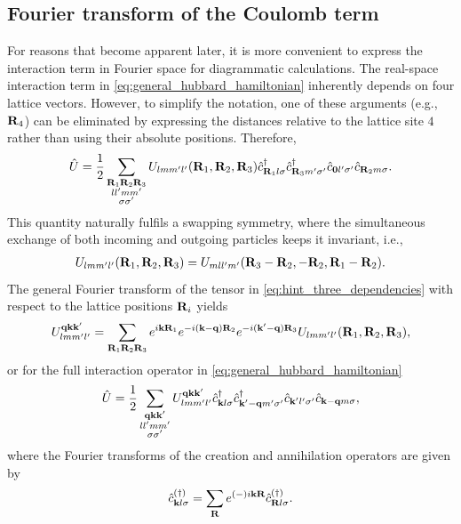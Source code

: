 \documentclass[../../main.tex]{subfiles}
\begin{document}
\subsection{Fourier transform of the Coulomb term}

For reasons that become apparent later, it is more convenient to express the interaction term in Fourier space for diagrammatic calculations. The real-space interaction term in \eqref{eq:general_hubbard_hamiltonian} inherently depends on four lattice vectors. However, to simplify the notation, one of these arguments (e.g., $\textbf{R}_4$) can be eliminated by expressing the distances relative to the lattice site $4$ rather than using their absolute positions. Therefore, 
\begin{align}
	\hat U=\frac 12 \sum_{\substack{\textbf{R}_1\textbf{R}_2\textbf{R}_3\\ ll'mm'\\\sigma\sigma'}}U_{lmm'l'}(\textbf{R}_1,\textbf{R}_2,\textbf{R}_3) \hat c^{\dagger}_{\textbf{R}_1l\sigma} \hat c^{\dagger}_{\textbf{R}_3 m'\sigma'} \hat c_{\textbf{0}l'\sigma'} \hat c_{\textbf{R}_2m\sigma}.\label{eq:hint_three_dependencies}
\end{align} 
This quantity naturally fulfils a swapping symmetry, where the simultaneous exchange of both incoming and outgoing particles keeps it invariant, i.e.,
\begin{align}
 	U_{lmm'l'}(\textbf{R}_1,\textbf{R}_2,\textbf{R}_3)=U_{mll'm'}(\textbf{R}_3-\textbf{R}_2,-\textbf{R}_2,\textbf{R}_1-\textbf{R}_2).
\end{align} 
The general Fourier transform of the tensor in \eqref{eq:hint_three_dependencies} with respect to the lattice positions $\textbf{R}_i$ yields
\begin{align}
	U_{lmm'l'}^{\textbf{qkk}'}=\sum_{\textbf{R}_1\textbf{R}_2\textbf{R}_3} e^{i\textbf{kR}_1}e^{-i(\textbf{k}-\textbf{q})\textbf{R}_2}e^{-i(\textbf{k}'-\textbf{q})\textbf{R}_3}U_{lmm'l'}(\textbf{R}_1,\textbf{R}_2,\textbf{R}_3),
\end{align}
or for the full interaction operator in \eqref{eq:general_hubbard_hamiltonian}
\begin{align}
	\hat U=\frac 12 \sum_{\substack{\textbf{qkk}'\\ ll'mm'\\\sigma\sigma'}}U_{lmm'l'}^{\textbf{qkk}'}\hat c^{\dagger}_{\textbf{k}l\sigma} \hat c^{\dagger}_{\textbf{k}'-\textbf{q} m'\sigma'} \hat c_{\textbf{k}'l'\sigma'} \hat c_{\textbf{k}-\textbf{q}m\sigma},
\end{align}
where the Fourier transforms of the creation and annihilation operators are given by
\begin{align}
	\hat c^{(\dagger)}_{\textbf{k}l\sigma}=\sum_{\textbf{R}}e^{(-)i\textbf{kR}}\hat c^{(\dagger)}_{\textbf{R}l\sigma}.
\end{align}
\end{document}
